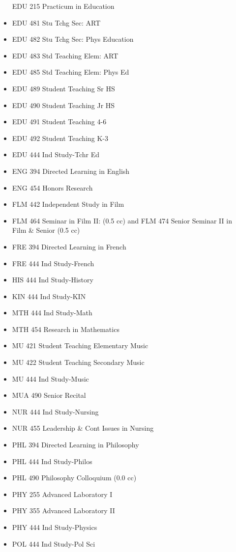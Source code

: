 \documentclass[
  letterpaper,
]{scrbook}
\begin{document}
\begin{itemize}
  EDU 215 Practicum in Education
\item
  EDU 481 Stu Tchg Sec: ART
\item
  EDU 482 Stu Tchg Sec: Phys Education
\item
  EDU 483 Std Teaching Elem: ART
\item
  EDU 485 Std Teaching Elem: Phys Ed
\item
  EDU 489 Student Teaching Sr HS
\item
  EDU 490 Student Teaching Jr HS
\item
  EDU 491 Student Teaching 4-6
\item
  EDU 492 Student Teaching K-3
\item
  EDU 444 Ind Study-Tchr Ed
\item
  ENG 394 Directed Learning in English
\item
  ENG 454 Honors Research
\item
  FLM 442 Independent Study in Film
\item
  FLM 464 Seminar in Film II: (0.5 cc) and FLM 474 Senior Seminar II in
  Film \& Senior (0.5 cc)
\item
  FRE 394 Directed Learning in French
\item
  FRE 444 Ind Study-French
\item
  HIS 444 Ind Study-History
\item
  KIN 444 Ind Study-KIN
\item
  MTH 444 Ind Study-Math
\item
  MTH 454 Research in Mathematics
\item
  MU 421 Student Teaching Elementary Music
\item
  MU 422 Student Teaching Secondary Music
\item
  MU 444 Ind Study-Music
\item
  MUA 490 Senior Recital
\item
  NUR 444 Ind Study-Nursing
\item
  NUR 455 Leadership \& Cont Issues in Nursing
\item
  PHL 394 Directed Learning in Philosophy
\item
  PHL 444 Ind Study-Philos
\item
  PHL 490 Philosophy Colloquium (0.0 cc)
\item
  PHY 255 Advanced Laboratory I
\item
  PHY 355 Advanced Laboratory II
\item
  PHY 444 Ind Study-Physics
\item
  POL 444 Ind Study-Pol Sci

\end{itemize}
\end{document}
